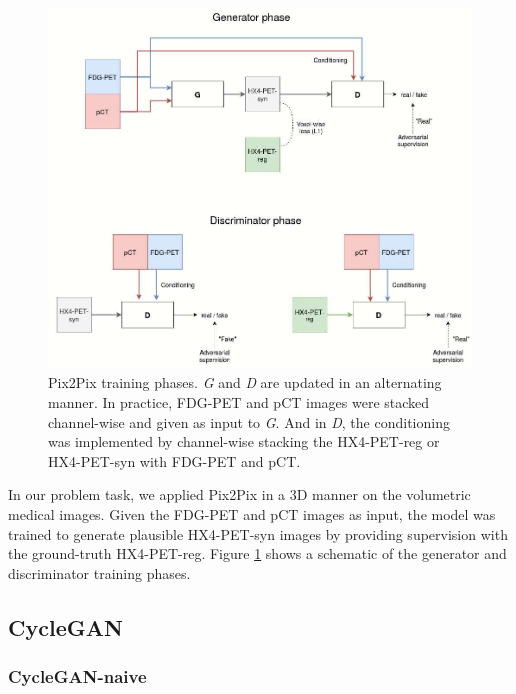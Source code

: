 \begin{figure}[h!]
    \centering
    \includegraphics[width=\linewidth]{figures/GANs/Pix2Pix.jpg}
    \caption{Pix2Pix training phases. \textit{G} and \textit{D} are updated in an alternating manner. In practice, FDG-PET and pCT images were stacked channel-wise and given as input to \textit{G}. And in \textit{D}, the conditioning was implemented by channel-wise stacking the HX4-PET-reg or HX4-PET-syn with FDG-PET and pCT.}
    \label{fig:pix2pix}
\end{figure}{}

In our problem task, we applied Pix2Pix in a 3D manner on the volumetric medical images. Given the FDG-PET and pCT images as input, the model was trained to generate plausible HX4-PET-syn images by providing supervision with the ground-truth HX4-PET-reg. Figure \ref{fig:pix2pix} shows a schematic of the generator and discriminator training phases.


\subsection{CycleGAN}
\label{cyclegan}

\subsubsection{CycleGAN-naive}

